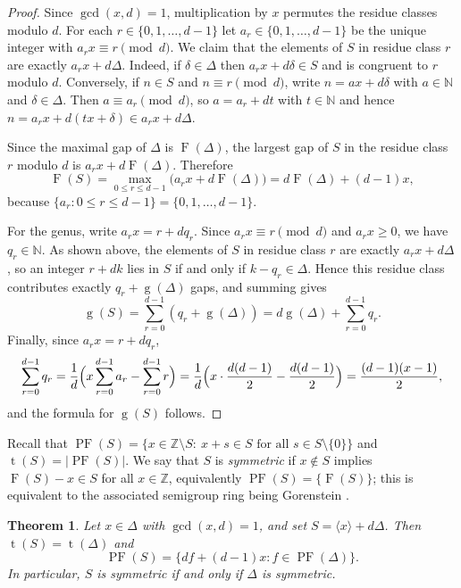 \documentclass[12pt,a4paper]{amsart}
\newtheorem{theorem}{Theorem}[section]
\theoremstyle{definition}
\theoremstyle{remark}
\begin{document}
\begin{proof}
Since $\gcd(x,d)=1$, multiplication by $x$ permutes the residue classes modulo $d$. For each $r\in\{0,1,\dots,d-1\}$ let
$a_r\in\{0,1,\dots,d-1\}$ be the unique integer with $a_r x\equiv r\pmod d$.
We claim that the elements of $S$ in residue class $r$ are exactly $a_r x+d\Delta$.
Indeed, if $\delta\in\Delta$ then $a_r x+d\delta\in S$ and is congruent to $r$ modulo $d$.
Conversely, if $n\in S$ and $n\equiv r\pmod d$, write $n=ax+d\delta$ with $a\in\mathbb{N}$ and $\delta\in\Delta$.
Then $a\equiv a_r\pmod d$, so $a=a_r+dt$ with $t\in\mathbb{N}$ and hence
$n=a_r x+d(tx+\delta)\in a_r x+d\Delta$.

Since the maximal gap of $\Delta$ is $\operatorname{F}(\Delta)$, the largest gap of $S$ in the residue class $r$ modulo $d$ is $a_r x+d\operatorname{F}(\Delta)$.
Therefore
\[
\operatorname{F}(S)=\max_{0\le r\le d-1}\bigl(a_r x+d\operatorname{F}(\Delta)\bigr)=d\operatorname{F}(\Delta)+(d-1)x,
\]
because $\{a_r:0\le r\le d-1\}=\{0,1,\dots,d-1\}$.

For the genus, write $a_r x=r+d q_r$. Since $a_r x\equiv r\pmod d$ and $a_r x\ge0$, we have $q_r\in\mathbb{N}$. As shown above, the elements of $S$ in residue class $r$ are exactly $a_r x+d\Delta$, so an integer $r+dk$ lies in $S$ if and only if $k-q_r\in\Delta$. Hence this residue class contributes exactly $q_r+\operatorname{g}(\Delta)$ gaps, and summing gives
\[
\operatorname{g}(S)=\sum_{r=0}^{d-1}(q_r+\operatorname{g}(\Delta))=d\operatorname{g}(\Delta)+\sum_{r=0}^{d-1}q_r.
\]
Finally, since $a_r x=r+dq_r$,
\[
\sum_{r=0}^{d-1}q_r=\frac{1}{d}\Bigl(x\sum_{r=0}^{d-1}a_r-\sum_{r=0}^{d-1}r\Bigr)
=\frac{1}{d}\Bigl(x\cdot\frac{d(d-1)}{2}-\frac{d(d-1)}{2}\Bigr)=\frac{(d-1)(x-1)}{2},
\]
and the formula for $\operatorname{g}(S)$ follows.
\end{proof}

Recall that $\operatorname{PF}(S)=\{x\in \mathbb{Z}\setminus S:\ x+s\in S \text{ for all } s\in S\setminus\{0\}\}$ and $\operatorname{t}(S)=|\operatorname{PF}(S)|$.
We say that $S$ is \emph{symmetric} if $x\notin S$ implies $\operatorname{F}(S)-x\in S$ for all $x\in\mathbb{Z}$, equivalently $\operatorname{PF}(S)=\{\operatorname{F}(S)\}$; this is equivalent to the associated semigroup ring being Gorenstein \cite{kunz}.

\begin{theorem}\label{th:PF-rankone}
Let $x\in \Delta$ with $\gcd(x,d)=1$, and set $S=\langle x\rangle+d\Delta$. Then $\operatorname{t}(S)=\operatorname{t}(\Delta)$ and
\[
\operatorname{PF}(S)=\{df+(d-1)x : f\in \operatorname{PF}(\Delta)\}.
\]
In particular, $S$ is symmetric if and only if $\Delta$ is symmetric.
\end{theorem}
\end{document}
